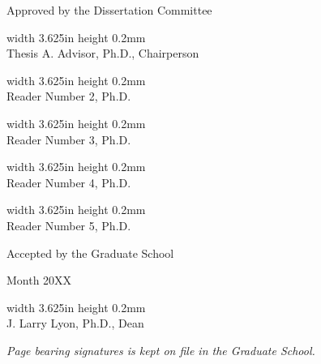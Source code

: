 \documentclass[12pt]{report} %
\newcommand{\mymentor}{Thesis A. Advisor, Ph.D.} %
\newcommand{\shortsignatureline}[1]{ 
        \begin{singlespacing}
        \begin{center}
        \vrule width 3.625in height 0.2mm
        \\
        \vspace{-.05in}
        #1 
        \end{center}
        \end{singlespacing}
}
\numberwithin{equation}{subsection}
\numberwithin{figure}{chapter} %
\theoremstyle{numbernote}
\theoremstyle{nonumber}
\theoremstyle{nonumbernonote}
\theoremstyle{nonote}
\begin{document}
\begin{minipage}{3.625in}
\begin{center}
Approved by the Dissertation Committee

\shortsignatureline{\mymentor{}, Chairperson}

\vspace{-.175in}

\shortsignatureline{Reader Number 2, Ph.D.} %

\vspace{-.175in}

\shortsignatureline{Reader Number 3, Ph.D.}

\vspace{-.175in}

\shortsignatureline{Reader Number 4, Ph.D.}

\vspace{-.175in}

{\color{white} \shortsignatureline{Reader Number 5, Ph.D.}} %
\end{center}
\end{minipage}

\vfill

{\hfill
\begin{minipage}{3.625in}
\begin{center}
Accepted by the Graduate School 

Month 20XX %

\shortsignatureline{J. Larry Lyon, Ph.D., Dean} %

\end{center}
\end{minipage}
}

\vfill

\begin{center}
    {\scriptsize \it Page bearing signatures is kept on file in the Graduate School.}
\end{center}


\pagebreak
\restoregeometry %
\end{document}
